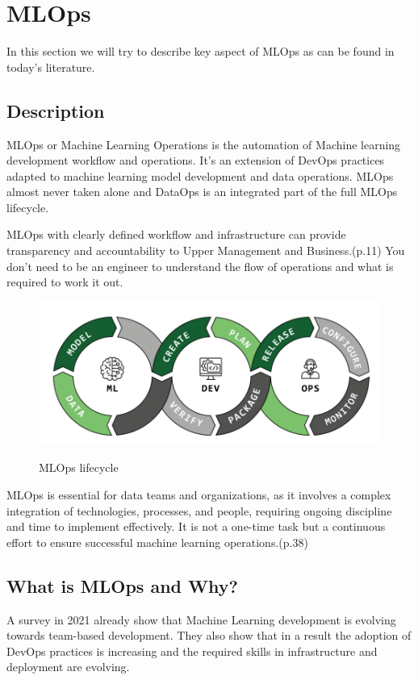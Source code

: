 \section{MLOps}\label{sec:mlops}

In this section we will try to describe key aspect of MLOps as can be found in today's literature.

\subsection{Description}\label{subsec:description}
MLOps or Machine Learning Operations is the automation of Machine learning development workflow and operations.
It's an extension of DevOps practices adapted to machine learning model development and data operations.
MLOps almost never taken alone and DataOps is an integrated part of the full MLOps lifecycle\cite{Kreuzberger2022MachineLO}.

MLOps with clearly defined workflow and infrastructure can provide transparency and accountability to Upper Management and Business.\cite{treveil2020introducing}(p.11)
You don't need to be an engineer to understand the flow of operations and what is required to work it out.

\begin{figure}[!htbp]
    \caption{MLOps lifecycle\cite{mlops-definition-tools-and-challenge}}
    \centering
    \includegraphics[scale=0.5]{images/ml-dev-ops}
    \label{fig:ml-dev-ops}
\end{figure}

MLOps is essential for data teams and organizations, as it involves a complex integration of technologies, processes, and people, requiring ongoing discipline and time to implement effectively.
It is not a one-time task but a continuous effort to ensure successful machine learning operations.\cite{treveil2020introducing}(p.38)


\subsection{What is MLOps and Why?}\label{subsec:why-mlops?}
A survey in 2021\cite{DBLP:journals/corr/abs-2103-08942} already show that Machine Learning development is evolving towards team-based development.
They also show that in a result the adoption of DevOps practices is increasing and the required skills in infrastructure and deployment are evolving.

